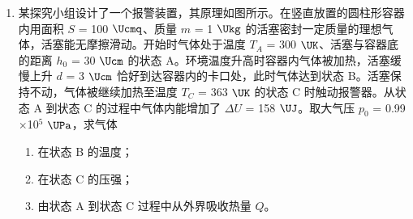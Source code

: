 \documentclass[\gkver]{gaokaozhenti}
\begin{document}
\begin{enumerate}
\item
某探究小组设计了一个报警装置，其原理如图所示。在竖直放置的圆柱形容器内用面积 $S$ = 100 $\Ucmq$、质量 $m$ = 1 $\Ukg$ 的活塞密封一定质量的理想气体，活塞能无摩擦滑动。开始时气体处于温度 $T_{A}$ = 300 $\UK$、活塞与容器底的距离 $h_{0}$ = 30 $\Ucm$ 的状态 A。环境温度升高时容器内气体被加热，活塞缓慢上升 $d$ = 3 $\Ucm$ 恰好到达容器内的卡口处，此时气体达到状态 B。活塞保持不动，气体被继续加热至温度 $T_{C}$ = 363 $\UK$ 的状态 C 时触动报警器。从状态 A 到状态 C 的过程中气体内能增加了 $\Delta U$ = 158 $\UJ$。取大气压 $p_{0}$ = 0.99$\times$10$^{5}$ $\UPa$，求气体
\begin{enumerate}
	\item
	在状态 B 的温度；
	\item
	在状态 C 的压强；
	\item
	由状态 A 到状态 C 过程中从外界吸收热量 $Q$。
\end{enumerate}


\end{enumerate}
\end{document}
